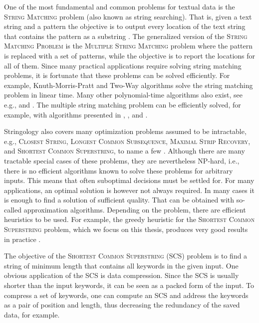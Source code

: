 \documentclass[english,twoside,censored,csm,algorithms-track-2020]{HYthesisML}
\theoremstyle{plain}
\theoremstyle{definition}
\begin{document}
One of the most fundamental and common problems for textual data is the \textsc{String Matching} problem
(also known as string searching). 
That is, given a text string and a pattern the objective is to output every location of
the text string that contains the pattern as a substring \citep{Gusfield97}.
The generalized version of the \textsc{String Matching Problem}
is the \textsc{Multiple String Matching} problem where the pattern is replaced
with a set of
patterns, while the objective is to report the locations for all of them.
Since many practical applications require solving string matching problems,
it is fortunate that these problems can be solved efficiently.
For example, Knuth-Morris-Pratt \citep{Knuth77} and Two-Way \citep{Crochemore91}
algorithms solve the string matching problem in linear time. Many other polynomial-time algorithms
also exist, see e.g., \citep{Karp87} and \citep{Horspool80}.
The multiple string matching problem can be efficiently solved, for example, with algorithms
presented in \citep{Aho75}, \citep{Navarro00}, \citep{Karp87} and \citep{CommentzWalter79}.

Stringology also covers many optimization problems assumed to be intractable, e.g., 
\textsc{Closest String},
\textsc{Longest Common Subsequence},
\textsc{Maximal Strip Recovery},
and
\textsc{Shortest Common Superstring},
to name a few \citep{Bulteau14}.
Although there are many tractable special cases of these problems, they are nevertheless
\textsc{NP}-hard, i.e., there is no efficient algorithms known to solve these
problems for arbitrary inputs.
This means that often suboptimal decisions must be settled for.
For many applications, an optimal solution is however not always required. In many cases it is
enough to find a solution of sufficient quality.
That can be obtained with so-called approximation algorithms.
Depending on the problem, there are efficient heuristics to be used. For example, the
greedy heuristic for the \textsc{Shortest Common Superstring} problem, which we focus on this
thesis, produces very good results in practice \citep{Romero04}. 

The objective of the \textsc{Shortest Common Superstring} (SCS) problem is to find a string of
minimum length that contains all keywords in the given input.
One obvious application of the SCS is data compression. Since the SCS is usually shorter
than the input keywords, it can be seen as a packed form of the input. To compress a set of keywords,
one can compute an SCS and address the keywords as a pair of position and length, thus decreasing
the redundancy of the saved data, for example.
\end{document}
